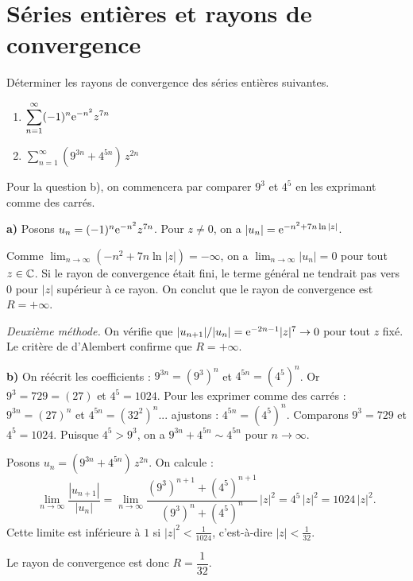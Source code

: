 \documentclass[12pt,a4paper]{article}
\begin{document}
\newpage
\section{Séries entières et rayons de convergence}

\begin{boiteexercice}
\niveau{\facile}
Déterminer les rayons de convergence des séries entières suivantes.
\begin{enumerate}[label=\alph*)]
  \item $\displaystyle\sum_{n=1}^{\infty} (-1)^n \mathrm{e}^{-n^2} z^{7n}$
  \item $\displaystyle\sum_{n=1}^{\infty} (9^{3n} + 4^{5n})\,z^{2n}$
\end{enumerate}
Pour la question b), on commencera par comparer $9^3$ et $4^5$ en les exprimant comme des carrés.
\end{boiteexercice}

\begin{boitecorrige}

\textbf{a)} Posons $u_n = (-1)^n \mathrm{e}^{-n^2} z^{7n}$. Pour $z \neq 0$, on a $|u_n| = \mathrm{e}^{-n^2 + 7n\ln|z|}$.

Comme $\lim_{n\to\infty}(-n^2 + 7n\ln|z|) = -\infty$, on a $\lim_{n\to\infty}|u_n| = 0$ pour tout $z \in \mathbb{C}$. Si le rayon de convergence était fini, le terme général ne tendrait pas vers $0$ pour $|z|$ supérieur à ce rayon. On conclut que le rayon de convergence est $R = +\infty$.

\textit{Deuxième méthode.} On vérifie que $|u_{n+1}|/|u_n| = \mathrm{e}^{-2n-1}|z|^7 \to 0$ pour tout $z$ fixé. Le critère de d'Alembert confirme que $R = +\infty$.

\textbf{b)} On réécrit les coefficients : $9^{3n} = (9^3)^n$ et $4^{5n} = (4^5)^n$. Or $9^3 = 729 = (27)$ et $4^5 = 1024$. Pour les exprimer comme des carrés : $9^{3n} = (27)^n$ et $4^{5n} = (32^2)^n$... ajustons : $4^{5n} = (4^5)^n$. Comparons $9^3 = 729$ et $4^5 = 1024$. Puisque $4^5 > 9^3$, on a $9^{3n} + 4^{5n} \sim 4^{5n}$ pour $n \to \infty$.

Posons $u_n = (9^{3n} + 4^{5n})\,z^{2n}$. On calcule :
\[
\lim_{n\to\infty}\frac{|u_{n+1}|}{|u_n|}
= \lim_{n\to\infty}\frac{(9^3)^{n+1}+(4^5)^{n+1}}{(9^3)^n+(4^5)^n}\,|z|^2
= 4^5\,|z|^2 = 1024\,|z|^2.
\]
Cette limite est inférieure à $1$ si $|z|^2 < \tfrac{1}{1024}$, c'est-à-dire $|z| < \tfrac{1}{32}$.

Le rayon de convergence est donc $R = \dfrac{1}{32}$.
\end{boitecorrige}
\end{document}
